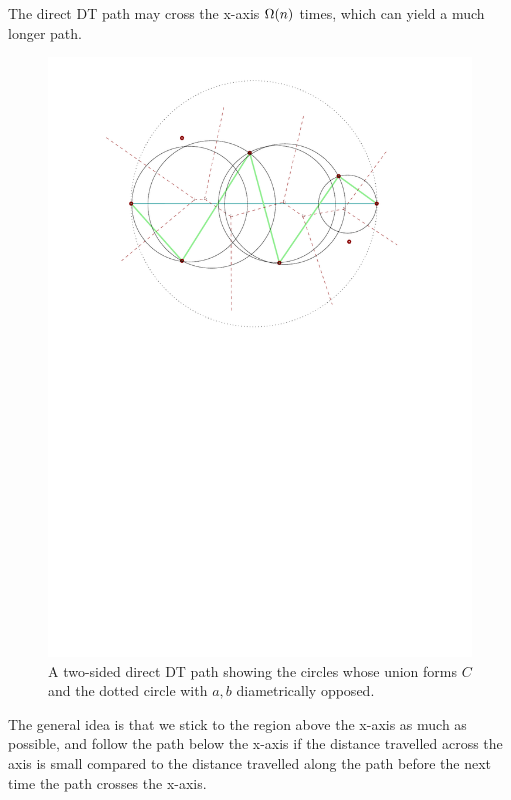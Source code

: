 \documentclass{tufte-handout}
\begin{document}
The direct DT path may cross the x-axis $\Omega\!\left(n\right)$ times,
which can yield a much longer path.

\begin{figure}
  \includegraphics[scale=1.0]{figures/two_sided_path_center_circles.pdf}
  \caption{A two-sided direct DT path showing the circles whose union
    forms $C$ and the dotted circle with $a,b$ diametrically
    opposed.}
\end{figure}

The general idea is that we stick to the region above the x-axis as
much as possible, and follow the path below the x-axis if the distance
travelled across the axis is small compared to the distance travelled
along the path before the next time the path crosses the x-axis.
\end{document}
